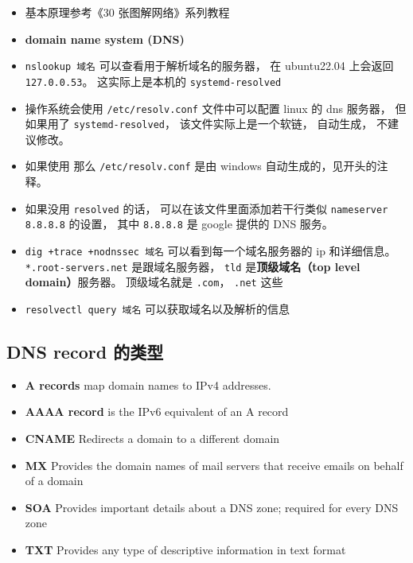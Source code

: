
\begin{issues}
\issueDraft
\end{issues}

\begin{itemize}
\item 基本原理参考《30 张图解网络》系列教程
\item \textbf{domain name system (DNS)}
\item \verb`nslookup 域名` 可以查看用于解析域名的服务器， 在 ubuntu22.04 上会返回 \verb`127.0.0.53`。 这实际上是本机的 \verb`systemd-resolved`
\item 操作系统会使用 \verb`/etc/resolv.conf` 文件中可以配置 linux 的 dns 服务器， 但如果用了 \verb`systemd-resolved`， 该文件实际上是一个软链， 自动生成， 不建议修改。
\item 如果使用  那么 \verb`/etc/resolv.conf` 是由 windows 自动生成的，见开头的注释。
\item 如果没用 \verb`resolved` 的话， 可以在该文件里面添加若干行类似 \verb`nameserver 8.8.8.8` 的设置， 其中 \verb`8.8.8.8` 是 google 提供的 DNS 服务。
\item \verb`dig +trace +nodnssec 域名` 可以看到每一个域名服务器的 ip 和详细信息。 \verb`*.root-servers.net` 是跟域名服务器， \verb`tld` 是\textbf{顶级域名（top level domain）}服务器。 顶级域名就是 \verb`.com`， \verb`.net` 这些
\item \verb`resolvectl query 域名` 可以获取域名以及解析的信息
\end{itemize}

\subsection{DNS record 的类型}
\begin{itemize}
\item \textbf{A records} map domain names to IPv4 addresses.
\item \textbf{AAAA record} is the IPv6 equivalent of an A record
\item \textbf{CNAME}	Redirects a domain to a different domain
\item \textbf{MX} Provides the domain names of mail servers that receive emails on behalf of a domain
\item \textbf{SOA} Provides important details about a DNS zone; required for every DNS zone
\item \textbf{TXT} Provides any type of descriptive information in text format
\end{itemize}

